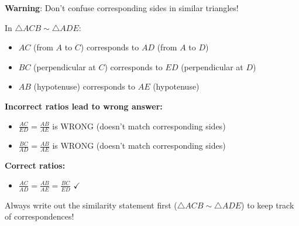 \documentclass[]{article}
\begin{document}
\begin{warningbox}
\textbf{Warning}: Don't confuse corresponding sides in similar triangles!

In $\triangle ACB \sim \triangle ADE$:
\begin{itemize}
    \item $AC$ (from $A$ to $C$) corresponds to $AD$ (from $A$ to $D$)
    \item $BC$ (perpendicular at $C$) corresponds to $ED$ (perpendicular at $D$)
    \item $AB$ (hypotenuse) corresponds to $AE$ (hypotenuse)
\end{itemize}

\textbf{Incorrect ratios lead to wrong answer:}
\begin{itemize}
    \item $\frac{AC}{ED} = \frac{AB}{AE}$ is WRONG (doesn't match corresponding sides)
    \item $\frac{BC}{AD} = \frac{AB}{AE}$ is WRONG (doesn't match corresponding sides)
\end{itemize}

\textbf{Correct ratios:}
\begin{itemize}
    \item $\frac{AC}{AD} = \frac{AB}{AE} = \frac{BC}{ED}$ $\checkmark$
\end{itemize}

Always write out the similarity statement first ($\triangle ACB \sim \triangle ADE$) to keep track of correspondences!
\end{warningbox}
\end{document}
